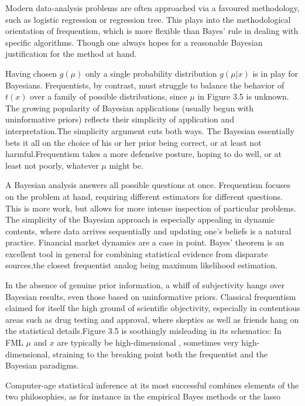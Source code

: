 \documentclass{article}
\begin{document}
Modern data-analysis problems are often approached via a favoured
methodology, such as logistic regression or regression tree. This plays
into the methodological orientation of frequentism, which is more
flexible than Bayes' rule in dealing with specific algorithms. Though
one always hopes for a reasonable Bayesian justification for the method
at hand.

Having chosen \(g(\mu)\) only a single probability distribution
\(g(\mu|x)\) is in play for Bayesians. Frequentists, by contrast, must
struggle to balance the behavior of \(t(x)\) over a family of possible
distributions, since \(\mu\) in Figure 3.5 is unknown. The growing
popularity of Bayesian applications (usually begun with uninformative
priors) reflects their simplicity of application and interpretation.The
simplicity argument cuts both ways. The Bayesian essentially bets it all
on the choice of his or her prior being correct, or at least not
harmful.Frequentism takes a more defensive posture, hoping to do well,
or at least not poorly, whatever \(\mu\) might be.

A Bayesian analysis answers all possible questions at once. Frequentism
focuses on the problem at hand, requiring different estimators for
different questions. This is more work, but allows for more intense
inspection of particular problems. The simplicity of the Bayesian
approach is especially appealing in dynamic contents, where data arrives
sequentially and updating one's beliefs is a natural practice. Financial
market dynamics are a case in point. Bayes' theorem is an excellent tool
in general for combining statistical evidence from disparate sources,the
closest frequentist analog being maximum likelihood estimation.

In the absence of genuine prior information, a whiff of subjectivity
hangs over Bayesian results, even those based on uninformative priors.
Classical frequentism claimed for itself the high ground of scientific
objectivity, especially in contentious areas such as drug testing and
approval, where skeptics as well as friends hang on the statistical
details.Figure 3.5 is soothingly misleading in its schematics: In FML
\(\mu\) and \(x\) are typically be high-dimensional , sometimes very
high-dimensional, straining to the breaking point both the frequentist
and the Bayesian paradigms.

Computer-age statistical inference at its most successful combines
elements of the two philosophies, as for instance in the empirical Bayes
methods or the lasso
\end{document}
